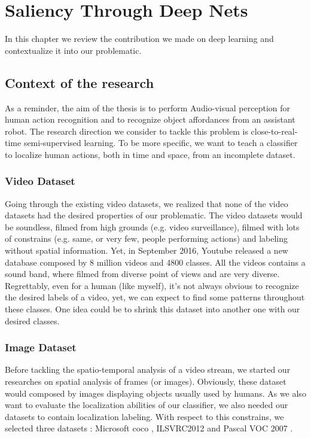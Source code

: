 \chapter{Saliency Through Deep Nets} %
\label{sec:saliency_through_deep_nets}
	
	In this chapter we review the contribution we made on deep learning and contextualize it into our problematic.

	\section{Context of the research}
	\label{sec:context_of_the_research}

		As a reminder, the aim of the thesis is to perform Audio-visual perception for human action recognition and to recognize object affordances from an assistant robot. The research direction we consider to tackle this problem is close-to-real-time semi-supervised learning. To be more specific, we want to teach a classifier to localize human actions, both in time and space, from an incomplete dataset. 	

		\subsection{Video Dataset}
		\label{sub:dataset}
			Going through the existing video datasets, we realized that none of the video datasets had the desired properties of our problematic. The video datasets would be soundless, filmed from high grounds (e.g. video surveillance), filmed with lots of constrains (e.g. same, or very few, people performing actions) and labeling without spatial information. Yet, in September 2016, Youtube released a new database \cite{abu2016youtube} composed by 8 million videos and 4800 classes. All the videos contains a sound band, where filmed from diverse point of views and are very diverse. Regrettably, even for a human (like myself), it's not always obvious to recognize the desired labels of a video, yet, we can expect to find some patterns throughout these classes. One idea could be to shrink this dataset into another one with our desired classes.


		\subsection{Image Dataset}
		\label{sub:image_dataset}
			Before tackling the spatio-temporal analysis of a video stream, we started our researches on spatial analysis of frames (or images). Obviously, these dataset would composed by images displaying objects usually used by humans. As we also want to evaluate the localization abilities of our classifier, we also needed our datasets to contain localization labeling. With respect to this constrains, we selected three datasets : Microsoft coco \cite{lin2014microsoft}, ILSVRC2012 \cite{ILSVRC15} and Pascal VOC 2007 \cite{pascalVoc2007}.



